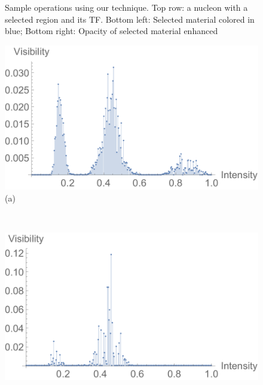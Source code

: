 \documentclass[twoside,twocolumn,10pt]{article}
\begin{document}
\begin{figure}[t]
\begin{minipage}{.2\textwidth}
		\label{fig:nucleon_2_alpha}
	\end{minipage}
	\caption{Sample operations using our technique. Top row: a nucleon with a selected region and its TF. Bottom left: Selected material colored in blue; Bottom right: Opacity of selected material enhanced}
	\label{fig:nucleon_ori}
\end{figure}

\begin{figure}
	\centering
	\begin{minipage}{.245\textwidth}
		\centering
		\includegraphics[width=1\linewidth]{global_visibility_histogram}
		(a)%
		\label{fig:global_visibility_histogram}
	\end{minipage}~
	\begin{minipage}{.245\textwidth}
		\centering
		\includegraphics[width=1\linewidth]{local_visibility_histogram}

\end{minipage}
\end{figure}
\end{document}
